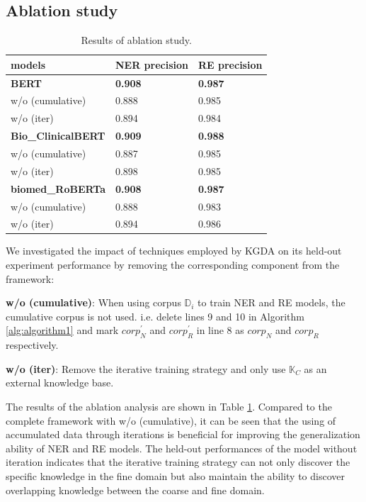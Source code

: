 \documentclass[sigconf]{acmart}
\begin{document}
\subsection{Ablation study}

\begin{table}[h]
	\centering
	\begin{tabular}{lll}
            \hline
            models                     & NER precision      & RE precision      \\ \hline
            \textbf{BERT}              & \textbf{0.908} & \textbf{0.987} \\
            w/o (cumulative)           & 0.888          & 0.985          \\
            w/o (iter)                 & 0.894          & 0.984          \\ \hline
            \textbf{Bio\_ClinicalBERT} & \textbf{0.909} & \textbf{0.988} \\
            w/o (cumulative)           & 0.887          & 0.985          \\
            w/o (iter)                 & 0.898          & 0.985          \\ \hline
            \textbf{biomed\_RoBERTa}   & \textbf{0.908} & \textbf{0.987} \\
            w/o (cumulative)           & 0.888          & 0.983          \\
            w/o (iter)                 & 0.894          & 0.986          \\ \hline
            \end{tabular}
	\caption{Results of ablation study.}
	\label{table5}
\end{table}

We investigated the impact of techniques employed by KGDA on its held-out experiment performance by removing the corresponding component from the framework:

\textbf{w/o (cumulative)}: When using corpus $\mathbb{D}_{i}$ to train NER and RE models, the cumulative corpus is not used. i.e. delete lines 9 and 10 in Algorithm \ref{alg:algorithm1} and mark $corp_N^{'}$ and $corp_R^{'}$ in line 8 as $corp_{N}$ and $corp_{R}$ respectively. 

\textbf{w/o (iter)}: Remove the iterative training strategy and only use $\mathbb{K}_C$ as an external knowledge base.

The results of the ablation analysis are shown in Table \ref{table5}. Compared to the complete framework with w/o (cumulative), it can be seen that the using of accumulated data through iterations is beneficial for improving the generalization ability of NER and RE models. The held-out performances of the model without iteration indicates that the iterative training strategy can not only discover the specific knowledge in the fine domain but also maintain the ability to discover overlapping knowledge between the coarse and fine domain. 
\end{document}
